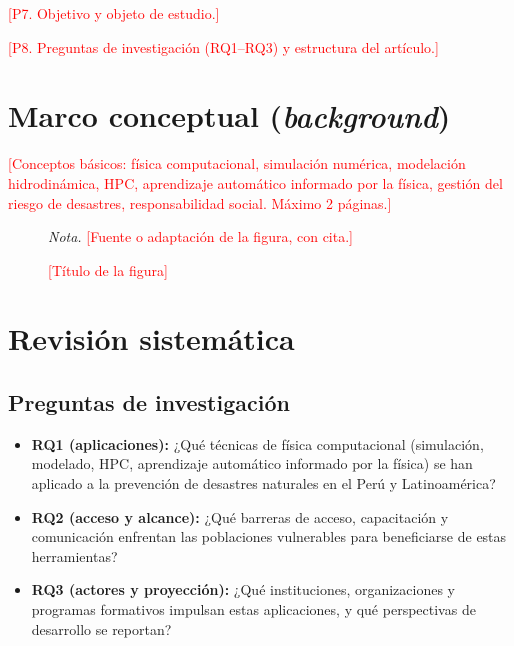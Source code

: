 \documentclass[12pt,a4paper]{article}
\newcommand{\relleno}[1]{\textcolor{red}{[#1]}}
\begin{document}
\relleno{P7. Objetivo y objeto de estudio.}

\relleno{P8. Preguntas de investigación (RQ1--RQ3) y estructura del artículo.}

\section{Marco conceptual (\textit{background})}
\relleno{Conceptos básicos: física computacional, simulación numérica, modelación hidrodinámica, HPC, aprendizaje automático informado por la física, gestión del riesgo de desastres, responsabilidad social. Máximo 2 páginas.}

\begin{figure}[ht]
  \centering
  \fbox{\parbox{0.8\textwidth}{\centering\relleno{Imagen obligatoria del background}}}
  \caption{\relleno{Título de la figura}}
  \label{fig:background}
  \par\smallskip\noindent\small\textit{Nota.} \relleno{Fuente o adaptación de la figura, con cita.}
\end{figure}

\section{Revisión sistemática}

\subsection{Preguntas de investigación}
\begin{itemize}
  \item \textbf{RQ1 (aplicaciones):} ¿Qué técnicas de física computacional (simulación, modelado, HPC, aprendizaje automático informado por la física) se han aplicado a la prevención de desastres naturales en el Perú y Latinoamérica?
  \item \textbf{RQ2 (acceso y alcance):} ¿Qué barreras de acceso, capacitación y comunicación enfrentan las poblaciones vulnerables para beneficiarse de estas herramientas?
  \item \textbf{RQ3 (actores y proyección):} ¿Qué instituciones, organizaciones y programas formativos impulsan estas aplicaciones, y qué perspectivas de desarrollo se reportan?
\end{itemize}
\end{document}
